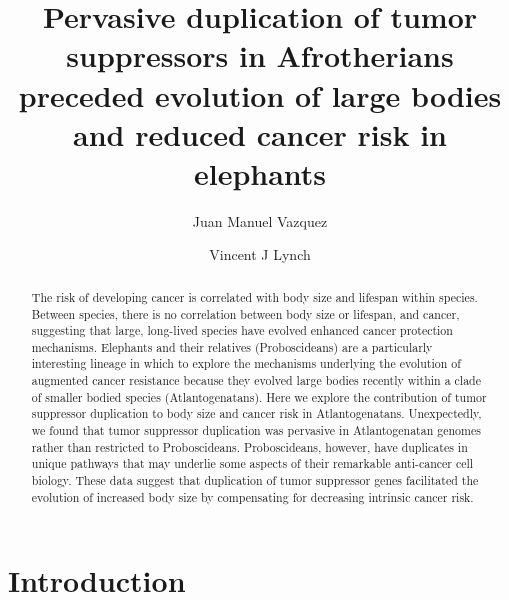 \documentclass[]{elsarticle} %
\begin{document}
\begin{frontmatter}

  \title{Pervasive duplication of tumor suppressors in Afrotherians preceded evolution of large bodies and reduced cancer risk in elephants}
    \author[University of Chicago]{Juan Manuel Vazquez}
  
    \author[SUNY Buffalo]{Vincent J Lynch}
  
      \address[University of Chicago]{Department of Human Genetics, 920 East 58th St, Chicago, IL, 60637}
    \address[SUNY Buffalo]{Department of Biological Sciences, 551 Cooke Hall, Buffalo NY, 14260}
    
  \begin{abstract}
  The risk of developing cancer is correlated with body size and lifespan within
  species. Between species, there is no correlation between body size or
  lifespan, and cancer, suggesting that large, long-lived species have evolved
  enhanced cancer protection mechanisms. Elephants and their relatives
  (Proboscideans) are a particularly interesting lineage in which to explore
  the mechanisms underlying the evolution of augmented cancer resistance because
  they evolved large bodies recently within a clade of smaller bodied species
  (Atlantogenatans). Here we explore the contribution of tumor suppressor
  duplication to body size and cancer risk in Atlantogenatans. Unexpectedly, we
  found that tumor suppressor duplication was pervasive in Atlantogenatan
  genomes rather than restricted to Proboscideans. Proboscideans, however, have
  duplicates in unique pathways that may underlie some aspects of their
  remarkable anti-cancer cell biology. These data suggest that duplication of
  tumor suppressor genes facilitated the evolution of increased body size by
  compensating for decreasing intrinsic cancer risk.
  \end{abstract}
  
 \end{frontmatter}

\newcommand{\beginsupplement}{%
        \setcounter{table}{0}
        \renewcommand{\thetable}{S.\thechapter.\arabic{table}}%
        \setcounter{figure}{0}
        \renewcommand{\thefigure}{S.\thechapter.\arabic{figure}}%
     }

\hypertarget{introduction}{%
\section{Introduction}\label{introduction}}
\end{document}
